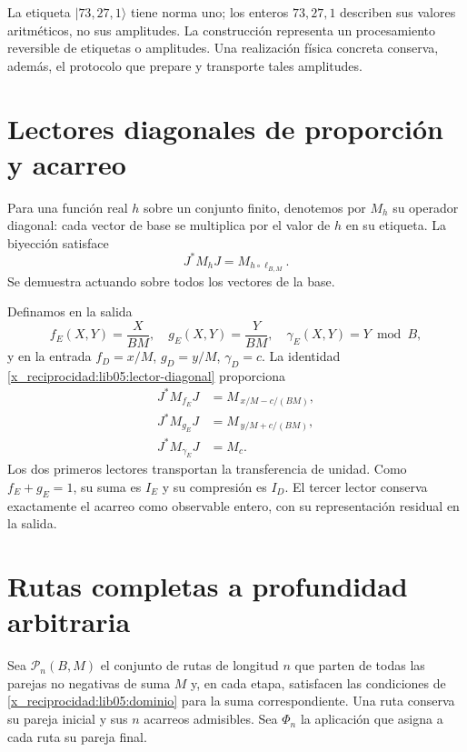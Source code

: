 La etiqueta \(|73,27,1\rangle\) tiene norma uno; los enteros
\(73,27,1\) describen sus valores aritméticos, no sus amplitudes.
La construcción representa un procesamiento reversible de etiquetas
o amplitudes. Una realización física concreta conserva, además,
el protocolo que prepare y transporte tales amplitudes.

\section{Lectores diagonales de proporción y acarreo}
\label{x_reciprocidad:lib05:diagonales}

Para una función real \(h\) sobre un conjunto finito, denotemos
por \(M_h\) su operador diagonal: cada vector de base se multiplica
por el valor de \(h\) en su etiqueta. La biyección satisface
\begin{equation}
 J^*M_hJ=M_{h\circ\ell_{B,M}}.
 \label{x_reciprocidad:lib05:lector-diagonal}
\end{equation}
Se demuestra actuando sobre todos los vectores de la base.

Definamos en la salida
\begin{equation}
 f_E(X,Y)=\frac{X}{BM},\quad
 g_E(X,Y)=\frac{Y}{BM},\quad
 \gamma_E(X,Y)=Y\bmod B,
 \label{x_reciprocidad:lib05:lectores-salida}
\end{equation}
y en la entrada \(f_D=x/M\), \(g_D=y/M\), \(\gamma_D=c\).
La identidad \eqref{x_reciprocidad:lib05:lector-diagonal} proporciona
\begin{align}
 J^*M_{f_E}J&=M_{\,x/M-c/(BM)},\nonumber\\
 J^*M_{g_E}J&=M_{\,y/M+c/(BM)},\nonumber\\
 J^*M_{\gamma_E}J&=M_c.
 \label{x_reciprocidad:lib05:transporte-fracciones}
\end{align}
Los dos primeros lectores transportan la transferencia de unidad.
Como \(f_E+g_E=1\), su suma es \(I_E\) y su compresión es
\(I_D\). El tercer lector conserva exactamente el acarreo como
observable entero, con su representación residual en la salida.

\section{Rutas completas a profundidad arbitraria}
\label{x_reciprocidad:lib05:rutas}

Sea \(\mathcal P_n(B,M)\) el conjunto de rutas de longitud \(n\)
que parten de todas las parejas no negativas de suma \(M\) y, en
cada etapa, satisfacen las condiciones de
\eqref{x_reciprocidad:lib05:dominio} para la suma correspondiente. Una ruta conserva
su pareja inicial y sus \(n\) acarreos admisibles. Sea
\(\Phi_n\) la aplicación que asigna a cada ruta su pareja final.

